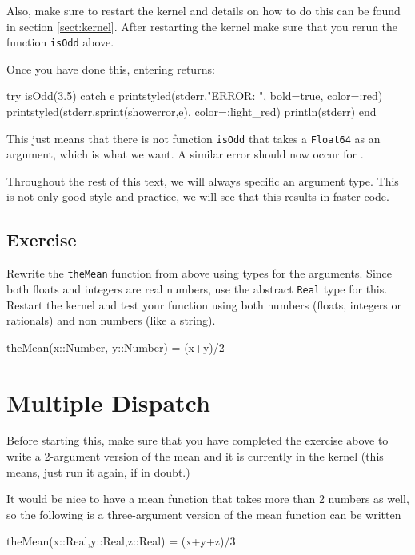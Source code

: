 Also, make sure to restart the kernel and details on how to do this can be found in section \ref{sect:kernel}.  After restarting the kernel make sure that you rerun the function \texttt{isOdd} above.

Once you have done this, entering  returns:
\begin{jlcode}[functions2]
try
  isOdd(3.5)
catch e
 printstyled(stderr,"ERROR: ", bold=true, color=:red)
 printstyled(stderr,sprint(showerror,e), color=:light_red)
 println(stderr)
end
\end{jlcode}
\stderrpythontex[verbatim]

This just means that there is not function \texttt{isOdd} that takes a \texttt{Float64} as an argument, which is what we want.  A similar error should now occur for .  

Throughout the rest of this text, we will always specific an argument type.  This is not only good style and practice, we will see that this results in faster code.  

\subsection{Exercise}

  Rewrite the \texttt{theMean} function from above using types for the arguments. Since both floats and integers are real numbers, use the abstract \texttt{Real} type for this. Restart the kernel and test your function using both numbers (floats, integers or rationals) and non numbers (like a string).

\begin{jlcode}[functions]
theMean(x::Number, y::Number) = (x+y)/2
\end{jlcode}

\section{Multiple Dispatch}

Before starting this, make sure that you have completed the exercise above to write a 2-argument version of the mean and it is currently in the kernel (this means, just run it again, if in doubt.)


It would be nice to have a mean function that takes more than 2 numbers as well, so the following is a 
three-argument version of the mean function can be written

\bigskip 

%
\begin{jlblock}[functions]
theMean(x::Real,y::Real,z::Real) = (x+y+z)/3
\end{jlblock}

